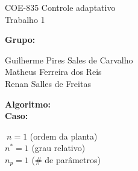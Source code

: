 \documentclass[11pt,a4paper]{article}
\begin{document}
\pagestyle{fancy}%
\renewcommand{\headrulewidth}  {0.4pt}%
\renewcommand{\footrulewidth}  {0.4pt}%
%
\chead{}%
\rhead{\bfseries\thepage}%
\lfoot{}%
\cfoot{}%
\rfoot{[\hours] \quad \today}%
\begin{center}
  \huge{COE-835  Controle  adaptativo}  \\[20mm]

  \Large{Trabalho 1} \\[20mm]
\end{center}

\textbf{Grupo:} \quad \parbox[t]{10cm}{
Guilherme Pires Sales de Carvalho \\[2mm]
Matheus Ferreira dos Reis \\[2mm]
Renan Salles de Freitas \\[10mm]
}

\textbf{Algoritmo:} \quad {}\\[2mm]

\bigskip%
\textbf{Caso:} \quad \parbox[t]{10cm}{
  $~n = 1$ \quad (ordem da planta) \\[2mm]
  $n^* = 1$ \quad (grau relativo) \\[2mm]
  $n_p = 1$ \quad (\# de parâmetros) \\[15mm]
}

\tableofcontents
\newpage
 \newpage

 \newpage


%
%

\end{document}
